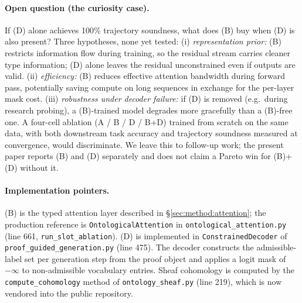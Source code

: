 \paragraph{Open question (the curiosity case).} If (D) alone achieves
100\% trajectory soundness, what does (B) buy when (D) is also present?
Three hypotheses, none yet tested:
(i) \emph{representation prior:} (B) restricts information flow during
training, so the residual stream carries cleaner type information; (D)
alone leaves the residual unconstrained even if outputs are valid.
(ii) \emph{efficiency:} (B) reduces effective attention bandwidth during
forward pass, potentially saving compute on long sequences in exchange
for the per-layer mask cost.
(iii) \emph{robustness under decoder failure:} if (D) is removed (e.g.\
during research probing), a (B)-trained model degrades more gracefully
than a (B)-free one.
A four-cell ablation (A / B / D / B+D) trained from scratch on the same
data, with both downstream task accuracy and trajectory soundness
measured at convergence, would discriminate. We leave this to follow-up
work; the present paper reports (B) and (D) separately and does not
claim a Pareto win for (B)+(D) without it.

\paragraph{Implementation pointers.} (B) is the typed attention layer
described in \S\ref{sec:method:attention}; the production reference is
\texttt{OntologicalAttention} in
\texttt{ontological\_attention.py} (line 661,
\texttt{run\_slot\_ablation}). (D) is implemented in
\texttt{ConstrainedDecoder} of \texttt{proof\_guided\_generation.py}
(line 475). The decoder constructs the admissible-label set per
generation step from the proof object and applies a logit mask of
$-\infty$ to non-admissible vocabulary entries. Sheaf cohomology is
computed by the \texttt{compute\_cohomology} method of
\texttt{ontology\_sheaf.py} (line 219), which is now vendored into the
public repository.
